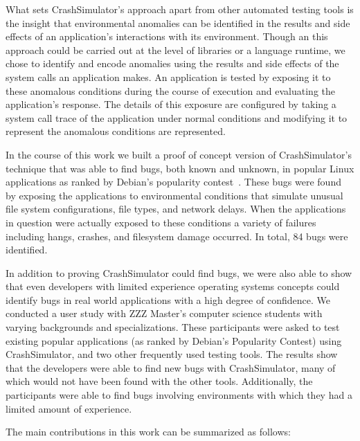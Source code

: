 
What sets CrashSimulator's approach apart from other automated testing
tools is the insight that environmental anomalies can be identified
in the results and side effects of an application's interactions with its
environment.
Though an this approach could be carried out at the level of libraries or a
language runtime, we chose to identify and encode anomalies using the
results and side effects of the system calls an application makes.
An application is tested by exposing it to these anomalous
conditions during the course of execution and evaluating the application's
response.  The details of this exposure are configured by taking a
system call trace of the application under normal conditions and modifying
it to represent the anomalous conditions are represented.

In the course of this work we built a proof of concept version of
CrashSimulator's technique that was able to find bugs, both known and
unknown, in popular Linux applications as ranked by Debian's popularity
contest~\cite{DebPopCon}.  These bugs were found by exposing the
applications to environmental conditions that simulate unusual file system
configurations, file types, and network delays.  When the applications in
question were actually exposed to these conditions a variety of failures
including hangs, crashes, and filesystem damage occurred.  In total, 84
bugs were identified.

In addition to proving CrashSimulator could find bugs, we were also able to
show that even developers with limited experience operating systems
concepts could identify bugs in real world applications with a high degree
of confidence.
We conducted a user study with
ZZZ Master's computer
science students with varying backgrounds and specializations.  These
participants were asked to test existing popular applications (as ranked by
Debian's Popularity Contest) using CrashSimulator, and two other frequently
used testing tools.
The results show that the developers were able to find new bugs with
CrashSimulator, many of which would not have been found with the other
tools.  Additionally, the
participants were able to find bugs
involving environments with which they had a limited amount of experience.

The main contributions in this work can be summarized as follows:


